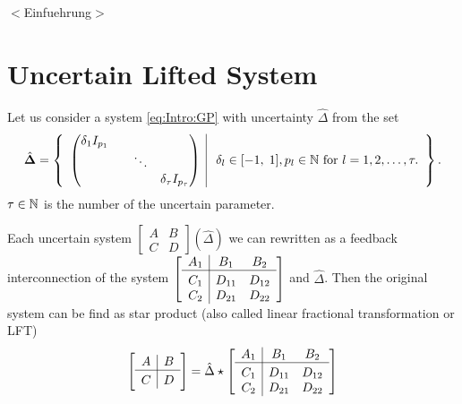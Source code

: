 %





{\color{red}$<$Einfuehrung$>$}


\section{Uncertain Lifted System} 

Let us consider a system \eqref{eq:Intro:GP} with uncertainty $\hat{\Delta} $ from the set 
\begin{align}
\label{eq:Delta_hat_set}
\hat{\mathbf{\Delta}} =
\left\{\begin{array}{c|c}
\begin{pmatrix}
\delta_1 I_{p_1} & & &\\
& & \ddots &\\
& & &\delta_\tau I_{p_\tau}
\end{pmatrix} & \; \delta_l \in [-1,\;1], p_l \in {\mathbb{N}} \text{ for } l = 1, 2, \dots , \tau .
\end{array} \right\}.
\end{align}
$\tau \in {\mathbb{N}}$ is the number of the uncertain parameter.

Each uncertain system $\left[\begin{array}{c|c}
A & B \\\hline C &D
\end{array}\right]\left(\hat{\Delta}\right)$
we can rewritten as a feedback interconnection of the system 
$
\left[\begin{array}{c|c c}
A_1 & B_1 & B_2 \\\hline
C_1 & D_{11} & D_{12} \\
C_2 & D_{21} & D_{22}
\end{array}\right]
$
and $\hat{\Delta}$. 
Then the original system can be find as star product (also called linear fractional transformation or LFT)
\begin{align}
\left[\begin{array}{c|c}
A & B \\\hline C &D
\end{array}\right] = \hat{\Delta} \star \left[\begin{array}{c|c c}
A_1 & B_1 & B_2 \\\hline
C_1 & D_{11} & D_{12} \\
C_2 & D_{21} & D_{22}	
\end{array}\right]
\end{align}

